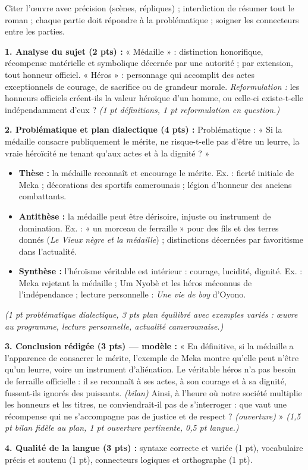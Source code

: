 \documentclass[11pt]{article}
\newcommand{\cle}[1]{{\popxbold\color{popdark}#1}}
\begin{document}
\begin{attention}
Citer l'œuvre avec précision (scènes, répliques) ; interdiction de résumer tout le roman ; chaque partie doit répondre à la problématique ; soigner les connecteurs entre les parties.
\end{attention}

\begin{corrige}
\textbf{1. Analyse du sujet (2 pts) :} « \cle{Médaille} » : distinction honorifique, récompense matérielle et symbolique décernée par une autorité ; par extension, tout honneur officiel. « \cle{Héros} » : personnage qui accomplit des actes exceptionnels de courage, de sacrifice ou de grandeur morale. \emph{Reformulation :} les honneurs officiels créent-ils la valeur héroïque d'un homme, ou celle-ci existe-t-elle indépendamment d'eux ? \emph{(1 pt définitions, 1 pt reformulation en question.)}

\textbf{2. Problématique et plan dialectique (4 pts) :} Problématique : « Si la médaille consacre publiquement le mérite, ne risque-t-elle pas d'être un leurre, la vraie héroïcité ne tenant qu'aux actes et à la dignité ? »
\begin{itemize}
\item \textbf{Thèse :} la médaille reconnaît et encourage le mérite. Ex. : fierté initiale de Meka ; décorations des sportifs camerounais ; légion d'honneur des anciens combattants.
\item \textbf{Antithèse :} la médaille peut être dérisoire, injuste ou instrument de domination. Ex. : « un morceau de ferraille » pour des fils et des terres donnés (\emph{Le Vieux nègre et la médaille}) ; distinctions décernées par favoritisme dans l'actualité.
\item \textbf{Synthèse :} l'héroïsme véritable est intérieur : courage, lucidité, dignité. Ex. : Meka rejetant la médaille ; Um Nyobè et les héros méconnus de l'indépendance ; lecture personnelle : \emph{Une vie de boy} d'Oyono.
\end{itemize}
\emph{(1 pt problématique dialectique, 3 pts plan équilibré avec exemples variés : œuvre au programme, lecture personnelle, actualité camerounaise.)}

\textbf{3. Conclusion rédigée (3 pts) — modèle :} « En définitive, si la médaille a l'apparence de consacrer le mérite, l'exemple de Meka montre qu'elle peut n'être qu'un leurre, voire un instrument d'aliénation. Le véritable héros n'a pas besoin de ferraille officielle : il se reconnaît à ses actes, à son courage et à sa dignité, fussent-ils ignorés des puissants. \emph{(bilan)} Ainsi, à l'heure où notre société multiplie les honneurs et les titres, ne conviendrait-il pas de s'interroger : que vaut une récompense qui ne s'accompagne pas de justice et de respect ? \emph{(ouverture)} » \emph{(1,5 pt bilan fidèle au plan, 1 pt ouverture pertinente, 0,5 pt langue.)}

\textbf{4. Qualité de la langue (3 pts) :} syntaxe correcte et variée (1 pt), vocabulaire précis et soutenu (1 pt), connecteurs logiques et orthographe (1 pt).
\end{corrige}
\end{document}
